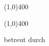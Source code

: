 \centering
{\scshape\LARGE \firma \par}
\vspace{1cm}
{\scshape\Large \arbeitstyp \par}
\vspace{1.5cm}
{\line(1,0){400} \par}
{\huge\bfseries \titel \par}
{\line(1,0){400} \par}
\vspace{2cm}
{\Large \fach \par }
\vspace{1cm}
{\Large\itshape \autor \par}
{\itshape \id \par}
\vfill
{betreut durch \par}
{\betreuertitel \ \betreuer \par}
\vfill
{\large \abgabedatum \par}
